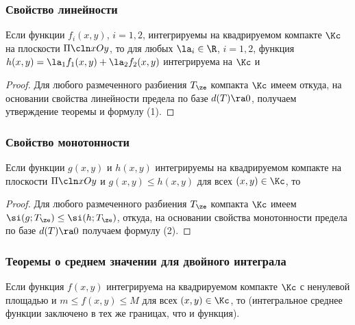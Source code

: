 \documentclass[a4paper]{article}
\begin{document}
\subsubsection{Свойство линейности}

\begin{theorem}
Если функции $f_i(x,y)$, $i=1,2$, интегрируемы на квадрируемом
компакте $\Kc$ на плоскости $\Pi\cln xOy$, то для любых
$\la_i\in\R$, $i=1,2$, функция $h(x,y)=\la_1 f_1(x,y) + \la_2
f_2(x,y)$ интегрируема на $\Kc$ и 
\end{theorem}

\begin{proof}
Для любого размеченного разбиения $T_{\ze}$ компакта $\Kc$ имеем
откуда, на основании свойства линейности предела по базе $d(T)\ra0$,
получаем утверждение теоремы и формулу (1).
\end{proof}

\subsubsection{Свойство монотонности}

\begin{theorem}
Если функции $g(x,y)$ и $h(x,y)$ интегрируемы на квадрируемом
компакте на плоскости $\Pi\cln xOy$ и $g(x,y)\le h(x,y)$ для всех
$(x,y)\in\Kc$, то 
\end{theorem}

\begin{proof}
Для любого размеченного разбиения $T_{\ze}$ компакта $\Kc$ имеем
$\si(g;T_{\ze})\le\si(h;T_{\ze})$, откуда, на основании свойства
монотонности предела по базе $d(T)\ra0$ получаем формулу (2).
\end{proof}

\subsubsection{Теоремы о среднем значении для двойного интеграла}
\begin{theorem}
\label{thm431} Если функция $f(x,y)$ интегрируема на квадрируемом
компакте $\Kc$ с ненулевой площадью и $m\le f(x,y)\le M$ для всех
$(x,y)\in\Kc$, то  (интегральное среднее функции заключено в тех
же границах, что и функция).
\end{theorem}
\end{document}
